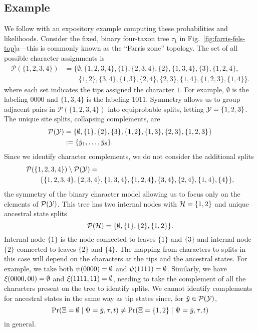 \subsection*{Example}
We follow with an expository example computing these probabilities and likelihoods.
Consider the fixed, binary four-taxon tree $\tau_1$ in Fig.~\ref{fig:farris-fels-top}a---this is commonly known as the ``Farris zone'' topology.
The set of all possible character assignments is
\begin{align*}
\mathcal{P}(\{1,2,3,4\}) &= \{\emptyset, \{1,2,3,4\}, \{1\}, \{2,3,4\}, \{2\}, \{1,3,4\}, \{3\}, \{1,2,4\}, \\
                         &\qquad \{1,2\}, \{3,4\}, \{1,3\}, \{2,4\}, \{2,3\}, \{1,4\}, \{1,2,3\}, \{1,4\}\}.
\end{align*}
where each set indicates the tips assigned the character $1$.
For example, $\emptyset$ is the labeling $0000$ and $\{1,3,4\}$ is the labeling $1011$.
Symmetry allows us to group adjacent pairs in $\mathcal{P}(\{1,2,3,4\})$ into equiprobable splits, letting $\mathcal{Y}=\{1,2,3\}$.
The unique site splits, collapsing complements, are
\begin{align*}
    \mathcal{P}(\mathcal{Y}) &= \{\emptyset, \{1\}, \{2\}, \{3\}, \{1,2\}, \{1,3\}, \{2,3\}, \{1,2,3\}\} \\
& := \{\tilde{y}_1, \ldots, \tilde{y}_8\}.
\end{align*}
Since we identify character complements, we do not consider the additional splits
\begin{equation*}
\begin{split}
& \mathcal{P}(\{1,2,3,4\}) \setminus \mathcal{P}(\mathcal{Y}) = \\
&\qquad \{\{1,2,3,4\}, \{2,3,4\}, \{1,3,4\}, \{1,2,4\}, \{3,4\}, \{2,4\}, \{1,4\}, \{4\}\},
\end{split}
\end{equation*}
the symmetry of the binary character model allowing us to focus only on the elements of $\mathcal{P}(\mathcal{Y})$.
This tree has two internal nodes with $\mathcal{H}=\{1,2\}$ and unique ancestral state splits
$$
\mathcal{P}(\mathcal{H}) = \{\emptyset, \{1\}, \{2\}, \{1,2\}\}.
$$
Internal node $\{1\}$ is the node connected to leaves $\{1\}$ and $\{3\}$ and internal node $\{2\}$ connected to leaves $\{2\}$ and $\{4\}$.
The mapping from characters to splits in this case will depend on the characters at the tips and the ancestral states.
For example, we take both $\psi(0000)=\emptyset$ and $\psi(1111)=\emptyset$.
Similarly, we have $\xi(0000, 00) = \emptyset$ and $\xi(1111, 11)=\emptyset$, needing to take the complement of all the characters present on the tree to identify splits.
We cannot identify complements for ancestral states in the same way as tip states since, for $\tilde{y}\in\mathcal{P}(\mathcal{Y})$,
$$
\Pr(\Xi=\emptyset \mid \Psi=\tilde{y}, \tau, t)\neq \Pr(\Xi=\{1,2\} \mid \Psi=\tilde{y}, \tau, t)
$$
in general.

